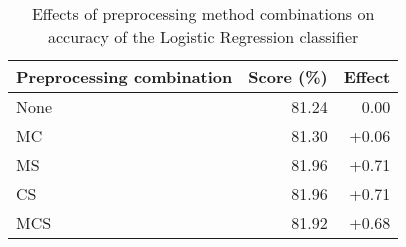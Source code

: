 \begin{table}
	\centering
	\begin{tabular}{| l | r | r |}
		\hline
		\textbf{Preprocessing combination} & \textbf{Score} (\%) & \textbf{Effect} \\ \hline
		None & 81.24 & 0.00 \\ \hline
		MC & \cellcolor{green!25}81.30 & \cellcolor{green!25}+0.06 \\ \hline
		MS & \cellcolor{green!25}81.96 & \cellcolor{green!25}+0.71 \\ \hline
		CS & \cellcolor{green!25}81.96 & \cellcolor{green!25}+0.71 \\ \hline
		MCS & \cellcolor{green!25}81.92 & \cellcolor{green!25}+0.68 \\ \hline	
	\end{tabular}
	\caption{Effects of preprocessing method combinations on accuracy of the Logistic Regression classifier}
	\label{tab:rnn-prep-results-comb}
\end{table}